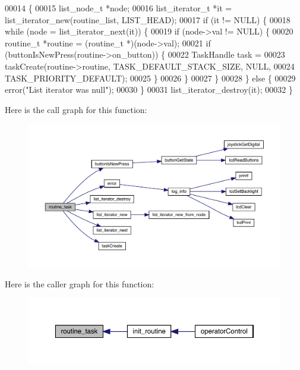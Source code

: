 \begin{DoxyCode}
00014                     \{
00015   list_node_t *node;
00016   list_iterator_t *it = list_iterator_new(routine_list, LIST_HEAD);
00017   \textcolor{keywordflow}{if} (it != NULL) \{
00018     \textcolor{keywordflow}{while} (node = list_iterator_next(it)) \{
00019       \textcolor{keywordflow}{if} (node->val != NULL) \{
00020         routine_t *routine = (routine_t *)(node->val);
00021         \textcolor{keywordflow}{if} (buttonIsNewPress(routine->on_button)) \{
00022           TaskHandle task =
00023               taskCreate(routine->routine, TASK\_DEFAULT\_STACK\_SIZE, NULL,
00024                          TASK\_PRIORITY\_DEFAULT);
00025         \}
00026       \}
00027     \}
00028   \} \textcolor{keywordflow}{else} \{
00029     error(\textcolor{stringliteral}{"List iterator was null"});
00030   \}
00031   list_iterator_destroy(it);
00032 \}
\end{DoxyCode}
Here is the call graph for this function\+:
\nopagebreak
\begin{figure}[H]
\begin{center}
\leavevmode
\includegraphics[width=350pt]{routines_8h_a230cdcefb410a429fb6baba1f88fc9ba_cgraph}
\end{center}
\end{figure}
Here is the caller graph for this function\+:
\nopagebreak
\begin{figure}[H]
\begin{center}
\leavevmode
\includegraphics[width=350pt]{routines_8h_a230cdcefb410a429fb6baba1f88fc9ba_icgraph}
\end{center}
\end{figure}

